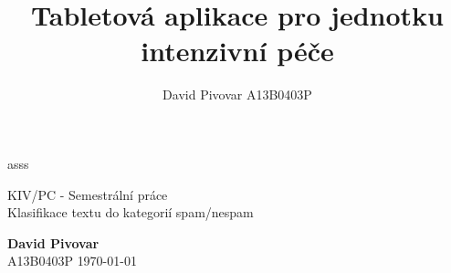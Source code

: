 \documentclass[12pt, a4paper]{report}
\title{Tabletová aplikace pro jednotku intenzivní péče}
\author{David Pivovar A13B0403P}
\begin{document}
\begin{titlepage}

\begin{top}
asss
\end{top}

\vfill

\begin{center}
	{\large KIV/PC - Semestrální práce\\[0.3cm]}
	{\huge Klasifikace textu do kategorií spam/nespam \\[1.7cm] }
\end{center}

\vfill

\begin{flushleft}
	{\large \textbf{David Pivovar}\\}
	{\large A13B0403P}
	\hfill
	{\large \today}
\end{flushleft}

\end{titlepage}
\end{document}
